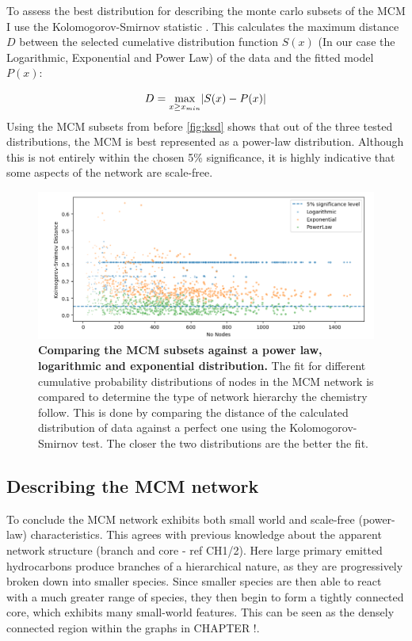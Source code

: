 To assess the best distribution for describing the monte carlo subsets of the MCM I use the Kolomogorov-Smirnov statistic \citep{ks}. This calculates the maximum distance $D$ between the selected cumelative distribution function $S(x)$ (In our case the Logarithmic, Exponential and Power Law) of the data and the fitted model $P(x)$:

\begin{equation}
D = \smash{\displaystyle\max_{x \ge x_{min}}} |{S(x) - P(x)}|
\end{equation}

Using the MCM subsets from before \autoref{fig:ksd} shows that out of the three tested distributions, the MCM is best represented as a power-law distribution. Although this is not entirely within the chosen 5\% significance, it is highly indicative that some aspects of the network are scale-free.

\begin{figure}[H]
     \centering
         \includegraphics[width=\textwidth]{figures_c3/KSdistance.png}
        \caption{\textbf{Comparing the MCM subsets against a power law, logarithmic and exponential distribution.} The fit for different cumulative probability distributions of nodes in the MCM network is compared to determine the type of network hierarchy the chemistry follow. This is done by comparing the distance of the calculated distribution of data against a perfect one using the Kolomogorov-Smirnov test. The closer the two distributions are the better the fit. }
        \label{fig:ksd}
\end{figure}

\subsection{Describing the MCM network}
To conclude the MCM network exhibits both small world and scale-free (power-law) characteristics. This agrees with previous knowledge about the apparent network structure (branch and core - ref CH1/2). Here large primary emitted hydrocarbons produce branches of a hierarchical nature, as they are progressively broken down into smaller species. Since smaller species are then able to react with a much greater range of species, they then begin to form a tightly connected core, which exhibits many small-world features. This can be seen as the densely connected region within the graphs in CHAPTER !. 

